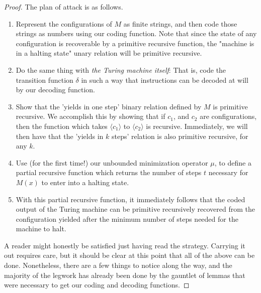 \documentclass{article}
\theoremstyle{definition}
\theoremstyle{plain}
\theoremstyle{theorem}
\begin{document}
\begin{proof}
    The plan of attack is as follows.
    \begin{enumerate}
        \item Represent the configurations of $M$ as finite strings, and then code those strings as numbers using our coding function. Note that since the state of any configuration is recoverable by a primitive recursive function, the "machine is in a halting state" unary relation will be primitive recursive. 
        \item Do the same thing with \textit{the Turing machine itself}: That is, code the transition function $\delta$ in such a way that instructions can be decoded at will by our decoding function.
        \item Show that the 'yields in one step' binary relation defined by $M$ is primitive recursive. We accomplish this by showing that if $c_1$, and $c_2$ are configurations, then the function which takes $\langle c_1 \rangle$ to $\langle c_2 \rangle$ is recursive. Immediately, we will then have that the 'yields in $k$ steps' relation is also primitive recursive, for any $k$.
        \item Use (for the first time!) our unbounded minimization operator $\mu$, to define a partial recursive function which returns the number of steps $t$ necessary for $M(x)$ to enter into a halting state.
        \item With this partial recursive function, it immediately follows that the coded output of the Turing machine can be primitive recursively recovered from the configuration yielded after the minimum number of steps needed for the machine to halt. 
    \end{enumerate}
    A reader might honestly be satisfied just having read the strategy. Carrying it out requires care, but it should be clear at this point that all of the above can be done. Nonetheless, there are a few things to notice along the way, and the majority of the legwork has already been done by the gauntlet of lemmas that were necessary to get our coding and decoding functions.

\end{proof}
\end{document}

